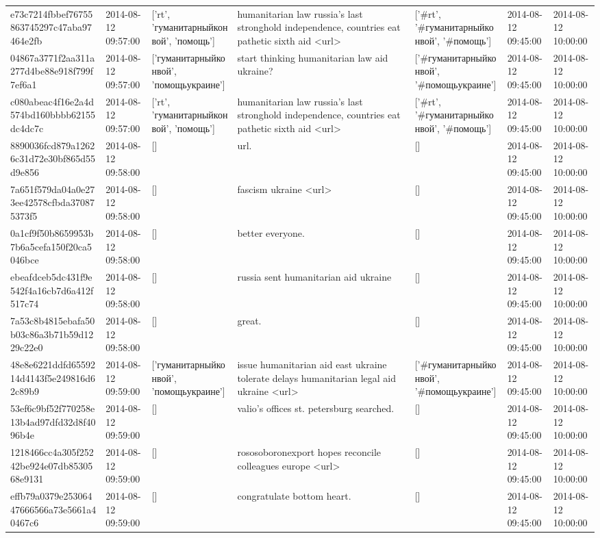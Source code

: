 \begin{tabular}{lllllll}
e73c7214fbbef76755863745297c47aba97464e2fb & 2014-08-12 09:57:00 & ['rt', 'гуманитарныйконвой', 'помощь'] & humanitarian law russia's last stronghold independence, countries eat pathetic sixth aid <url> & ['#rt', '#гуманитарныйконвой', '#помощь'] & 2014-08-12 09:45:00 & 2014-08-12 10:00:00 \\
04867a3771f2aa311a277d4be88e918f799f7ef6a1 & 2014-08-12 09:57:00 & ['гуманитарныйконвой', 'помощьукраине'] & start thinking humanitarian law aid ukraine? & ['#гуманитарныйконвой', '#помощьукраине'] & 2014-08-12 09:45:00 & 2014-08-12 10:00:00 \\
c080abeac4f16e2a4d574bd160bbbb62155dc4dc7c & 2014-08-12 09:57:00 & ['rt', 'гуманитарныйконвой', 'помощь'] & humanitarian law russia's last stronghold independence, countries eat pathetic sixth aid <url> & ['#rt', '#гуманитарныйконвой', '#помощь'] & 2014-08-12 09:45:00 & 2014-08-12 10:00:00 \\
8890036fcd879a12626c31d72e30bf865d55d9e856 & 2014-08-12 09:58:00 & [] & url. & [] & 2014-08-12 09:45:00 & 2014-08-12 10:00:00 \\
7a651f579da04a0e273ee42578cfbda370875373f5 & 2014-08-12 09:58:00 & [] & fascism ukraine <url> & [] & 2014-08-12 09:45:00 & 2014-08-12 10:00:00 \\
0a1cf9f50b8659953b7b6a5cefa150f20ca5046bce & 2014-08-12 09:58:00 & [] & better everyone. & [] & 2014-08-12 09:45:00 & 2014-08-12 10:00:00 \\
ebeafdceb5dc431f9e542f4a16cb7d6a412f517c74 & 2014-08-12 09:58:00 & [] & russia sent humanitarian aid ukraine & [] & 2014-08-12 09:45:00 & 2014-08-12 10:00:00 \\
7a53c8b4815ebafa50b03c86a3b71b59d1229c22e0 & 2014-08-12 09:58:00 & [] & great. & [] & 2014-08-12 09:45:00 & 2014-08-12 10:00:00 \\
48e8e6221ddfd6559214d4143f5e249816d62c89b9 & 2014-08-12 09:59:00 & ['гуманитарныйконвой', 'помощьукраине'] & issue humanitarian aid east ukraine tolerate delays humanitarian legal aid ukraine <url> & ['#гуманитарныйконвой', '#помощьукраине'] & 2014-08-12 09:45:00 & 2014-08-12 10:00:00 \\
53ef6c9bf52f770258e13b4ad97dfd32d8f4096b4e & 2014-08-12 09:59:00 & [] & valio's offices st. petersburg searched. & [] & 2014-08-12 09:45:00 & 2014-08-12 10:00:00 \\
1218466cc4a305f25242be924e07db8530568e9131 & 2014-08-12 09:59:00 & [] & rososoboronexport hopes reconcile colleagues europe <url> & [] & 2014-08-12 09:45:00 & 2014-08-12 10:00:00 \\
effb79a0379e25306447666566a73e5661a40467c6 & 2014-08-12 09:59:00 & [] & congratulate bottom heart. & [] & 2014-08-12 09:45:00 & 2014-08-12 10:00:00 \\
\bottomrule
\end{tabular}
